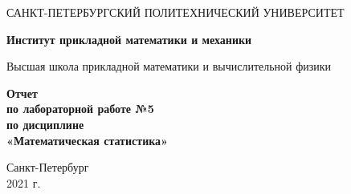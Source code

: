 \begin{titlepage}
   \begin{center}
       \vspace*{3cm}
       \large{САНКТ-ПЕТЕРБУРГСКИЙ ПОЛИТЕХНИЧЕСКИЙ УНИВЕРСИТЕТ}
       \vspace{0.4 cm}

       \large\textbf{Институт прикладной математики и механики}
       \vspace{0.4 cm}

       \large{Высшая школа прикладной математики и вычислительной физики}

       \vspace{3 cm}
       \normalsize\textbf{Отчет\\ по лабораторной работе №5\\ по дисциплине\\
«Математическая статистика»}
       \vfill

       \vspace{0.8cm}


       \normalsize{Санкт-Петербург\\2021 г.}

   \end{center}
\end{titlepage}